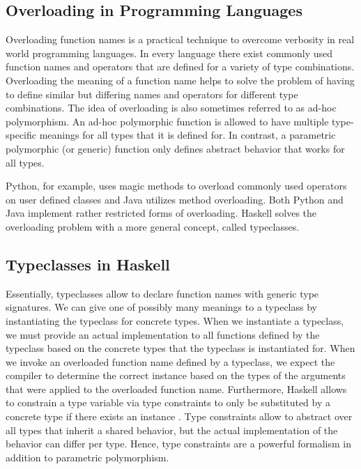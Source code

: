 \subsection{Overloading in Programming Languages}
Overloading function names is a practical technique to overcome verbosity in real world programming languages. 
In every language there exist commonly used function names and operators that are defined for a variety of type combinations.
Overloading the meaning of a function name helps to solve the problem of having to define similar but differing names and operators for different type combinations. 
The idea of overloading is also sometimes referred to as ad-hoc polymorphism. 
An ad-hoc polymorphic function is allowed to have multiple type-specific meanings for all types that it is defined for. 
In contrast, a parametric polymorphic (or generic) function only defines abstract behavior that works for all types.

\noindent Python, for example, uses magic methods to overload commonly used operators on user defined classes and Java utilizes method overloading. 
Both Python and Java implement rather restricted forms of overloading. 
Haskell solves the overloading problem with a more general concept, called typeclasses.

\subsection{Typeclasses in Haskell}
Essentially, typeclasses allow to declare function names with generic type signatures.
We can give one of possibly many meanings to a typeclass by instantiating the typeclass for concrete types. 
When we instantiate a typeclass, we must provide an actual implementation to all functions defined by the typeclass based on the concrete types that the typeclass is instantiated for.
When we invoke an overloaded function name defined by a typeclass, we expect the compiler to determine the correct instance based on the types of the arguments that were applied to the overloaded function name. 
Furthermore, Haskell allows to constrain a type variable  via type constraints  to only be substituted by a concrete type  if there exists an instance  . 
Type constraints allow to abstract over all types that inherit a shared behavior, but the actual implementation of the behavior can differ per type. 
Hence, type constraints are a powerful formalism in addition to parametric polymorphism.

